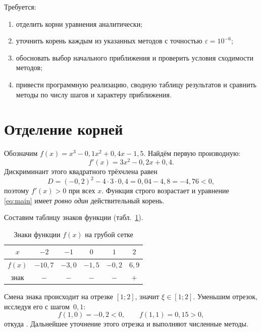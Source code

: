 \documentclass[14pt,a4paper]{extarticle}
\begin{document}
Требуется:
\begin{enumerate}
    \item отделить корни уравнения аналитически;
    \item уточнить корень каждым из указанных методов с точностью
          $\varepsilon = 10^{-6}$;
    \item обосновать выбор начального приближения и проверить условия
          сходимости методов;
    \item привести программную реализацию, сводную таблицу результатов
          и сравнить методы по числу шагов и характеру приближения.
\end{enumerate}

\section{Отделение корней}

Обозначим $f(x) = x^3 - 0{,}1x^2 + 0{,}4x - 1{,}5$. Найдём первую
производную:
\begin{equation}
    f'(x) = 3x^2 - 0{,}2x + 0{,}4 .
\end{equation}
Дискриминант этого квадратного трёхчлена равен
\begin{equation}
    D = (-0{,}2)^2 - 4\cdot 3 \cdot 0{,}4 = 0{,}04 - 4{,}8 = -4{,}76 < 0,
\end{equation}
поэтому $f'(x) > 0$ при всех $x$. Функция строго возрастает и уравнение
\eqref{eq:main} имеет \emph{ровно один} действительный корень.

Составим таблицу знаков функции (табл.~\ref{tab:signs}).

\begin{table}[H]
    \centering
    \caption{Знаки функции $f(x)$ на грубой сетке}
    \label{tab:signs}
    \begin{tabular}{c|ccccc}
        \toprule
        $x$    & $-2$ & $-1$ & $0$ & $1$ & $2$\\
        \midrule
        $f(x)$ & $-10{,}7$ & $-3{,}0$ & $-1{,}5$ & $-0{,}2$ & $6{,}9$\\
        знак   & $-$ & $-$ & $-$ & $-$ & $+$\\
        \bottomrule
    \end{tabular}
\end{table}

Смена знака происходит на отрезке $[1;2]$, значит $\xi \in [1;2]$.
Уменьшим отрезок, исследуя его с шагом~$0{,}1$:
\[
    f(1{,}0) = -0{,}2 < 0, \qquad f(1{,}1) = 0{,}15 > 0,
\]
откуда \boxed{\xi \in [1;\; 1{,}1]}. Дальнейшее уточнение этого отрезка
и выполняют численные методы.
\end{document}
